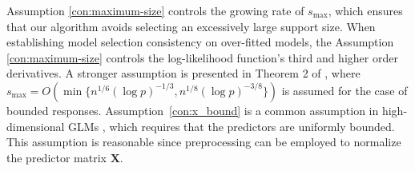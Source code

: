 \begin{remark}
Assumption \ref{con:maximum-size} controls the growing rate of $s_{\max}$, which ensures that our algorithm avoids selecting an excessively large support size. When establishing model selection consistency on over-fitted models, the Assumption \ref{con:maximum-size} controls the log-likelihood function's third and higher order derivatives. A stronger assumption is presented in Theorem 2 of \citet{fan2013tuning}, where $s_{\max} = O(\min\{ n^{1/6}(\log p)^{-1/3}, n^{1/8}(\log p)^{-3/8}\})$ is assumed for the case of bounded responses. Assumption~\ref{con:x_bound} is a common assumption in high-dimensional GLMs \citep*[see, e.g.,][]{feiEstimationInferenceHigh2021}, which requires that the predictors are uniformly bounded. This assumption is reasonable since preprocessing can be employed to normalize the predictor matrix $\mathbf{X}$. 
\end{remark}

